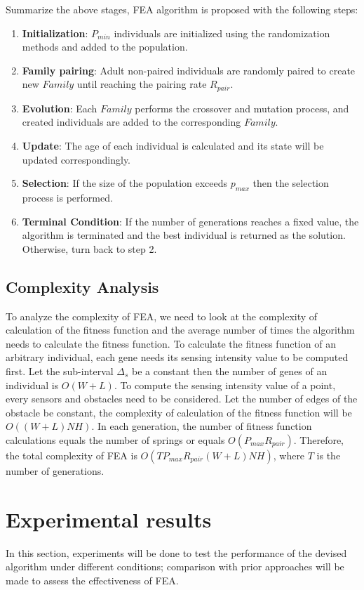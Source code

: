\documentclass[final]{elsarticle}
\begin{document}
Summarize the above stages, FEA algorithm is proposed with the following steps:

\begin{enumerate}
	\item \textbf{Initialization}: $P_{min}$ individuals are initialized using the randomization methods and added to the population.
	\item \textbf{Family pairing}: Adult non-paired individuals are randomly paired to create new $ Family $ until reaching the pairing rate $R_{pair}$.
	\item \textbf{Evolution}: Each $ Family $ performs the crossover and mutation process, and created individuals are added to the corresponding $ Family $.
	\item \textbf{Update}: The age of each individual is calculated and its state will be updated correspondingly.
	\item \textbf{Selection}: If the size of the population exceeds $p_{max}$ then the selection process is performed.
	\item \textbf{Terminal Condition}: If the number of generations reaches a fixed value, the algorithm is terminated and the best individual is returned as the solution. Otherwise, turn back to step 2.
\end{enumerate}

\subsection{Complexity Analysis}

To analyze the complexity of FEA, we need to look at the complexity of calculation of the fitness function and the average number of times the algorithm needs to calculate the fitness function. To calculate the fitness function of an arbitrary individual, each gene needs its sensing intensity value to be computed first. Let the sub-interval $ \Delta_s $ be a constant then the number of genes of an individual is $ O(W+L) $. To compute the sensing intensity value of a point, every sensors and obstacles need to be considered. Let the number of edges of the obstacle be constant, the complexity of calculation of the fitness function will be $ O((W+L)NH) $. In each generation, the number of fitness function calculations equals the number of springs or equals $O(P_{max}R_{pair})$. Therefore, the total complexity of FEA is $O(TP_{max}R_{pair}(W+L)NH)$, where $ T $ is the number of generations.

\section{Experimental results}
In this section, experiments will be done to test the performance of the devised algorithm under different conditions; comparison with prior approaches will be made to assess the effectiveness of FEA. 
\end{document}
